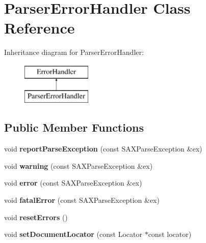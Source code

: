 \hypertarget{class_parser_error_handler}{\section{Parser\+Error\+Handler Class Reference}
\label{class_parser_error_handler}
}
Inheritance diagram for Parser\+Error\+Handler\+:\begin{figure}[H]
\begin{center}
\leavevmode
\includegraphics[height=2.000000cm]{class_parser_error_handler}
\end{center}
\end{figure}
\subsection*{Public Member Functions}
\begin{DoxyCompactItemize}
\item 
\hypertarget{class_parser_error_handler_a7e9893b8664f42e38cecb483f0d26791}{void {\bfseries report\+Parse\+Exception} (const S\+A\+X\+Parse\+Exception \&ex)}\label{class_parser_error_handler_a7e9893b8664f42e38cecb483f0d26791}

\item 
\hypertarget{class_parser_error_handler_aa63a6f504a4524985be39e0cdfa4e630}{void {\bfseries warning} (const S\+A\+X\+Parse\+Exception \&ex)}\label{class_parser_error_handler_aa63a6f504a4524985be39e0cdfa4e630}

\item 
\hypertarget{class_parser_error_handler_aa636e61f4f0fb47f38151e09c3711ee7}{void {\bfseries error} (const S\+A\+X\+Parse\+Exception \&ex)}\label{class_parser_error_handler_aa636e61f4f0fb47f38151e09c3711ee7}

\item 
\hypertarget{class_parser_error_handler_a95dede361c7ef584c9a732ca716c61a4}{void {\bfseries fatal\+Error} (const S\+A\+X\+Parse\+Exception \&ex)}\label{class_parser_error_handler_a95dede361c7ef584c9a732ca716c61a4}

\item 
\hypertarget{class_parser_error_handler_afcd94fcf4b801a4767a90b88721b432c}{void {\bfseries reset\+Errors} ()}\label{class_parser_error_handler_afcd94fcf4b801a4767a90b88721b432c}

\item 
\hypertarget{class_parser_error_handler_a1ce19b1e204d760ee30e4f7cd0dfc443}{void {\bfseries set\+Document\+Locator} (const Locator $\ast$const locator)}\label{class_parser_error_handler_a1ce19b1e204d760ee30e4f7cd0dfc443}

\end{DoxyCompactItemize}
